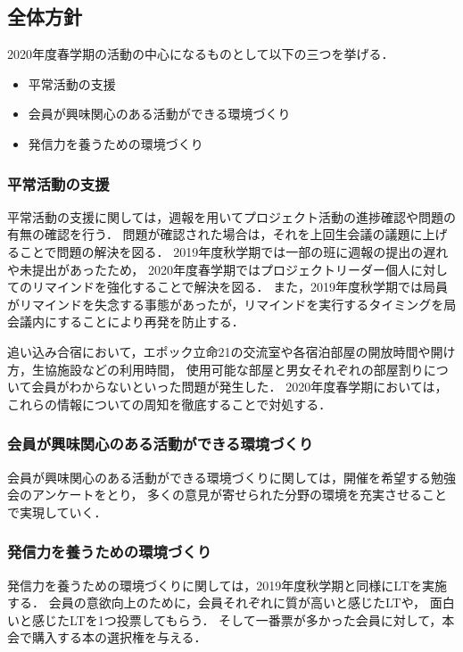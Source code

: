 \subsection*{全体方針}

2020年度春学期の活動の中心になるものとして以下の三つを挙げる．
\begin{itemize}
\item 平常活動の支援
\item 会員が興味関心のある活動ができる環境づくり
\item 発信力を養うための環境づくり
\end{itemize}

\subsubsection*{平常活動の支援}
平常活動の支援に関しては，週報を用いてプロジェクト活動の進捗確認や問題の有無の確認を行う．
問題が確認された場合は，それを上回生会議の議題に上げることで問題の解決を図る．
2019年度秋学期では一部の班に週報の提出の遅れや未提出があったため，
2020年度春学期ではプロジェクトリーダー個人に対してのリマインドを強化することで解決を図る．
また，2019年度秋学期では局員がリマインドを失念する事態があったが，リマインドを実行するタイミングを局会議内にすることにより再発を防止する．

追い込み合宿において，エポック立命21の交流室や各宿泊部屋の開放時間や開け方，生協施設などの利用時間，
使用可能な部屋と男女それぞれの部屋割りについて会員がわからないといった問題が発生した．
2020年度春学期においては，これらの情報についての周知を徹底することで対処する．

\subsubsection*{会員が興味関心のある活動ができる環境づくり}
会員が興味関心のある活動ができる環境づくりに関しては，開催を希望する勉強会のアンケートをとり，
多くの意見が寄せられた分野の環境を充実させることで実現していく．

\subsubsection*{発信力を養うための環境づくり}
発信力を養うための環境づくりに関しては，2019年度秋学期と同様にLTを実施する．
会員の意欲向上のために，会員それぞれに質が高いと感じたLTや，
面白いと感じたLTを1つ投票してもらう．
そして一番票が多かった会員に対して，本会で購入する本の選択権を与える．
